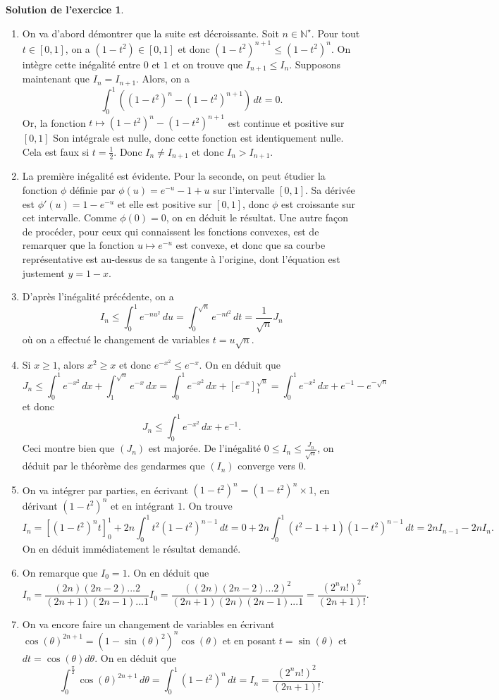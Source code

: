 \documentclass[a4paper, 11pt,openany]{article}%
\theoremstyle{plain}
\theoremstyle{definition}
\newtheorem{sol}{Solution de l'exercice}
\theoremstyle{remark}
\newcommand{\N}{\mathbb{N}}
\begin{document}
\begin{sol}
\begin{enumerate}
\item On va d'abord démontrer que la suite est décroissante. Soit $n \in \N^{\star}$. Pour tout $t \in [0,1]$, on a $(1-t^2)\in [0,1]$ et donc $(1-t^2)^{n+1} \leqslant (1-t^2)^n$. On intègre cette inégalité entre $0$ et $1$ et on trouve que $I_{n+1} \leqslant I_n$. Supposons maintenant que $I_n=I_{n+1}$. Alors, on a \[ \int_0^1 ((1-t^2)^n - (1-t^2)^{n+1}) \, dt=0.\]
Or, la fonction $t \mapsto (1-t^2)^n-(1-t^2)^{n+1}$ est continue et positive sur $[0,1]$ Son intégrale est nulle, donc cette fonction est identiquement nulle. Cela est faux si $t=\frac{1}{2}$. Donc $I_n \neq I_{n+1}$ et donc $I_n > I_{n+1}$.
\item La première inégalité est évidente. Pour la seconde, on peut étudier la fonction $\phi$
définie par $\phi(u)=e^{-u}-1+u$ sur l'intervalle $[0,1]$. Sa dérivée est $\phi'(u)=1-e^{-u}$ et elle est positive sur $[0,1]$, donc $\phi$ est croissante sur cet intervalle. Comme $\phi(0)=0$, on en déduit le résultat. Une autre façon de procéder, pour ceux qui connaissent les fonctions convexes, est de remarquer que la fonction $u \mapsto e^{-u}$ est convexe, et donc que sa courbe représentative est au-dessus de sa tangente à l'origine, dont l'équation est justement $y=1-x$.
\item D'après l'inégalité précédente, on a \[ I_n \leqslant \int_0^1 e^{-nu^2} \, du = \int_0^{\sqrt{n}} e^{-nt^2} \, dt = \frac{1}{\sqrt{n}} J_n\]
où on a effectué le changement de variables $t=u\sqrt{n}$.
\item Si $x\geqslant 1$, alors $x^2\geqslant x$ et donc $e^{-x^2} \leqslant e^{-x}$. On en déduit que \[J_n \leqslant \int_0^1 e^{-x^2} \, dx +  \int_1^{\sqrt{n}} e^{-x} \, dx = \int_0^1 e^{-x^2} \, dx + [ e^{-x} ]_1^{\sqrt{n}} = \int_0^1 e^{-x^2} \, dx + e^{-1} - e^{-\sqrt{n}}\]
et donc
\[ J_n \leqslant \int_0^1 e^{-x^2} \, dx + e^{-1}.\]
Ceci montre bien que $(J_n)$ est majorée. De l'inégalité $0 \leqslant I_n \leqslant \frac{J_n}{\sqrt{n}}$, on déduit par le théorème des gendarmes que $(I_n)$ converge vers $0$.
\item On va intégrer par parties, en écrivant $(1-t^2)^n=(1-t^2)^n \times 1$, en dérivant $(1-t^2)^n$ et en intégrant $1$. On trouve \[ I_n=[(1-t^2)^n t]_0^1 +2n \int_0^1 t^2 (1-t^2)^{n-1} \, dt=0+2n \int_0^1 (t^2-1+1) (1-t^2)^{n-1} \, dt= 2nI_{n-1} - 2n I_n.\]
On en déduit immédiatement le résultat demandé.
\item On remarque que $I_0=1$. On en déduit que \[ I_n=\frac{(2n)(2n-2)...2}{(2n+1)(2n-1)...1}I_0=\frac{((2n)(2n-2)...2)^2}{(2n+1)(2n)(2n-1)... 1}=\frac{(2^n n!)^2}{(2n+1)!}.\]
\item On va encore faire un changement de variables en écrivant $\cos(\theta)^{2n+1}=(1-\sin(\theta)^2)^n \cos(\theta)$ et en posant $t=\sin(\theta)$ et $dt=\cos(\theta) d \theta$. On en déduit que 
\[ \int_0^{\frac{\pi}{2}} \cos(\theta)^{2n+1} \, d\theta = \int_0^1(1-t^2)^n \, dt = I_n = \frac{(2^n n!)^2}{(2n+1)!}.\]
\end{enumerate}
\end{sol}
\end{document}
